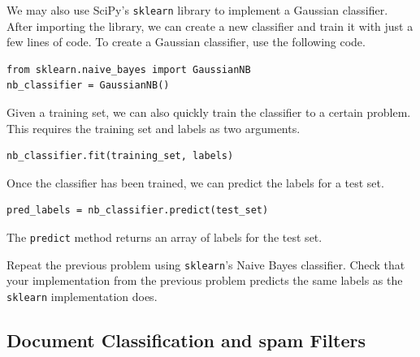 We may also use SciPy's {\tt sklearn} library to implement a Gaussian classifier.
After importing the library, we can create a new classifier and train it with just a few lines of code.
To create a Gaussian classifier, use the following code.

\begin{lstlisting}
from sklearn.naive_bayes import GaussianNB
nb_classifier = GaussianNB()
\end{lstlisting}

Given a training set, we can also quickly train the classifier to a certain problem.
This requires the training set and labels as two arguments.

\begin{lstlisting}
nb_classifier.fit(training_set, labels)
\end{lstlisting}

Once the classifier has been trained, we can predict the labels for a test set.

\begin{lstlisting}
pred_labels = nb_classifier.predict(test_set)
\end{lstlisting}

The {\tt predict} method returns an array of labels for the test set.

\begin{problem}

Repeat the previous problem using {\tt sklearn}'s Naive Bayes classifier.
Check that your implementation from the previous problem predicts the same labels as the {\tt sklearn}
implementation does.

\end{problem}


\subsection*{Document Classification and spam Filters}

